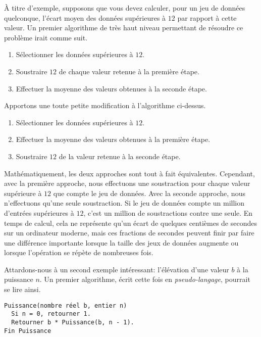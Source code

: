 À titre d'exemple, supposons que vous devez calculer, pour un jeu de
données quelconque, l'écart moyen des données supérieures à $12$ par
rapport à cette valeur. Un premier algorithme de très haut niveau
permettant de résoudre ce problème irait comme suit.

\begin{Schunk}
  \begin{enumerate}
  \item Sélectionner les données supérieures à $12$.
  \item Soustraire $12$ de chaque valeur retenue à la première étape.
  \item Effectuer la moyenne des valeurs obtenues à la seconde étape.
  \end{enumerate}
\end{Schunk}

Apportons une toute petite modification à l'algorithme ci-dessus.

\begin{Schunk}
  \begin{enumerate}
  \item Sélectionner les données supérieures à $12$.
  \item Effectuer la moyenne des valeurs obtenues à la première étape.
  \item Soustraire $12$ de la valeur retenue à la seconde étape.
  \end{enumerate}
\end{Schunk}

Mathématiquement, les deux approches sont tout à fait équivalentes.
Cependant, avec la première approche, nous effectuons une soustraction
pour chaque valeur supérieure à $12$ que compte le jeu de données. Avec
la seconde approche, nous n'effectuons qu'une seule soustraction. Si
le jeu de données compte un million d'entrées supérieures à $12$,
c'est un million de soustractions contre une seule. En temps de
calcul, cela ne représente qu'un écart de quelques centièmes de
secondes sur un ordinateur moderne, mais ces fractions de secondes
peuvent finir par faire une différence importante lorsque la taille
des jeux de données augmente ou lorsque l'opération se répète de
nombreuses fois.

Attardons-nous à un second exemple intéressant: l'élévation d'une
valeur $b$ à la puissance $n$. Un premier algorithme, écrit cette fois
en \emph{pseudo-langage}, pourrait se lire
ainsi.

\begin{Schunk}
\begin{Verbatim}
Puissance(nombre réel b, entier n)
  Si n = 0, retourner 1.
  Retourner b * Puissance(b, n - 1).
Fin Puissance
\end{Verbatim}
\end{Schunk}

